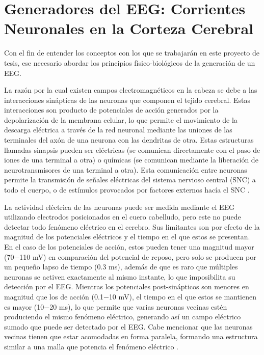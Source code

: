 \section{Generadores del EEG: Corrientes Neuronales en la Corteza Cerebral}
\label{sec:intro:generators}

Con el fin de entender los conceptos con los que se trabajarán en este proyecto de tesis, ese necesario abordar los principios físico-biológicos de la generación de un EEG.

La razón por la cual existen campos electromagnéticos en la cabeza se debe a las interacciones sinápticas de las neuronas que componen el tejido cerebral.
Estas interacciones son producto de potenciales de acción generados por la depolarización de la membrana celular, lo que permite el movimiento de la descarga eléctrica a través de la red neuronal mediante las uniones de las terminales del axón de una neurona con las dendritas de otra.
Estas estructuras llamadas sinapsis pueden ser eléctricas (se comunican directamente con el paso de iones de una terminal a otra) o químicas (se comunican mediante la liberación de neurotransmisores de una terminal a otra).
Esta comunicación entre neuronas permite la transmisión de señales eléctricas del sistema nervioso central (SNC) a todo el cuerpo, o de estímulos provocados por factores externos hacía el SNC \cite{kandelPrinciplesNeuralScience2013}.

La actividad eléctrica de las neuronas puede ser medida mediante el EEG utilizando electrodos posicionados en el cuero cabelludo, pero este no puede detectar todo fenómeno eléctrico en el cerebro.
Sus limitantes son por efecto de la magnitud de los potenciales eléctricos y el tiempo en el que estos se presentan.
En el caso de los potenciales de acción, estos pueden tener una magnitud mayor (70$-$110 mV) en comparación del potencial de reposo, pero solo se producen por un pequeño lapso de tiempo (0.3 ms), además de que es raro que múltiples neuronas se activen exactamente al mismo instante, lo que imposibilita su detección por el EEG.
Mientras los potenciales post-sinápticos son menores en magnitud que los de acción (0.1$-$10 mV), el tiempo en el que estos se mantienen es mayor (10$-$20 ms), lo que permite que varias neuronas vecinas estén produciendo el mismo fenómeno eléctrico, generando así un campo eléctrico sumado que puede ser detectado por el EEG.
Cabe mencionar que las neuronas vecinas tienen que estar acomodadas en forma paralela, formando una estructura similar a una malla que potencia el fenómeno eléctrico \cite{nichollsNeuronBrain2012, Hallez2007}.

